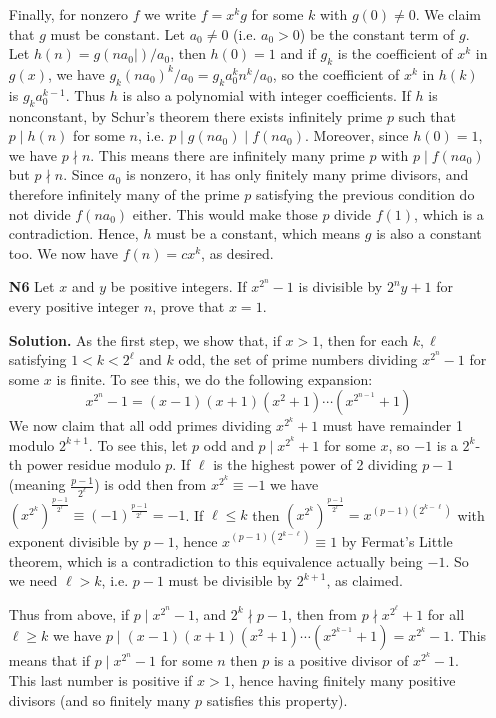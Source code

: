 \documentclass[11pt,a4paper]{article}
\begin{document}
\begin{enumerate}
	Finally, for nonzero $f$ we write $f=x^kg$ for some $k$ with $g(0)\neq 0$. We claim that $g$ must be constant. Let $a_0\neq 0$ (i.e. $a_0>0$) be the constant term of $g$. Let $h(n) = g(na_0|)/a_0$, then $h(0)=1$ and if $g_k$ is the coefficient of $x^k$ in $g(x)$, we have $g_k(na_0)^k/a_0=g_ka_0^kn^k/a_0$, so the coefficient of $x^k$ in $h(k)$ is $g_ka_0^{k-1}$. Thus $h$ is also a polynomial with integer coefficients. If $h$ is nonconstant, by Schur's theorem there exists infinitely prime $p$ such that $p\mid h(n)$ for some $n$, i.e. $p\mid g(na_0)\mid f(na_0)$. 
	Moreover, since $h(0)=1$, we have $p\nmid n$. This means there are infinitely many prime $p$ with $p\mid f(na_0)$ but $p\nmid n$. Since $a_0$ is nonzero, it has only finitely many prime divisors, and therefore infinitely many of the prime $p$ satisfying the previous condition do not divide $f(na_0)$ either. This would make those $p$ divide $f(1)$, which is a contradiction. Hence, $h$ must be a constant, which means $g$ is also a constant too. We now have $f(n)=cx^k$, as desired. 
	
	\item[\textbf{N6}] Let $x$ and $y$ be positive integers. If ${x^{2^n}}-1$ is divisible by $2^ny+1$ for every positive integer $n$, prove that $x=1$.
	
	\textbf{Solution.} As the first step, we show that, if $x>1$, then for each $k, \ell$ satisfying $1<k<2^\ell$ and $k$ odd, the set of prime numbers dividing $x^{2^n}-1$ for some $x$ is finite. 
	To see this, we do the following expansion: 
	\[
	x^{2^n}-1=(x-1)(x+1)(x^2+1)\cdots (x^{2^{n-1}}+1)
	\]
	We now claim that all odd primes dividing $x^{2^k}+1$ must have remainder 1 modulo $2^{k+1}$. To see this, let $p$ odd and $p\mid x^{2^k}+1$ for some $x$, so $-1$ is a $2^k$-th power residue modulo $p$. 
	If $\ell$ is the highest power of 2 dividing $p-1$ (meaning $\frac{p-1}{2^\ell}$) is odd then from $x^{2^k}\equiv -1$ we have $(x^{2^k})^{\frac{p-1}{2^{\ell}}}\equiv (-1)^{\frac{p-1}{2^{\ell}}}=-1$. If $\ell\le k$ then $(x^{2^k})^{\frac{p-1}{2^{\ell}}}=x^{(p-1)(2^{k-\ell})}$ with exponent divisible by $p-1$, hence $x^{(p-1)(2^{k-\ell})}\equiv 1$ by Fermat's Little theorem, which is a contradiction to this equivalence actually being $-1$. So we need $\ell>k$, i.e. $p-1$ must be divisible by $2^{k+1}$, as claimed. 
	
	Thus from above, if $p\mid x^{2^n}-1$, and $2^{k}\nmid p-1$, then from $p\nmid x^{2^\ell}+1$ for all $\ell\ge k$ we have $p\mid (x-1)(x+1)(x^2+1)\cdots (x^{2^{k-1}}+1) = x^{2^k}-1$. 
	This means that if $p\mid x^{2^n}-1$ for some $n$ then $p$ is a positive divisor of $x^{2^k}-1$. This last number is positive if $x>1$, hence having finitely many positive divisors (and so finitely many $p$ satisfies this property). 
	

\end{enumerate}
\end{document}
